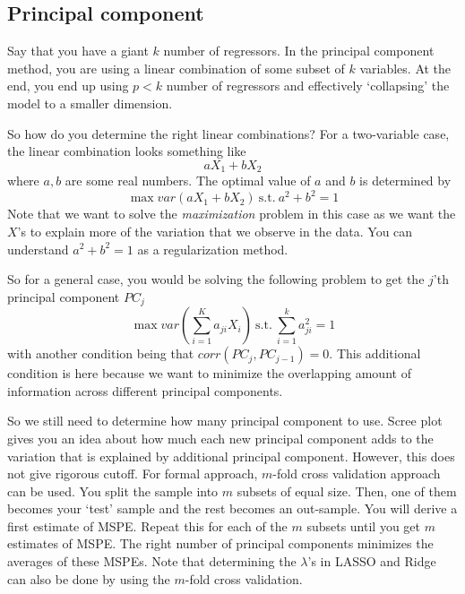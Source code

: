 \documentclass[12pt]{article}
\theoremstyle{definition}
\theoremstyle{property}
\theoremstyle{assumption}
\theoremstyle{example}
\theoremstyle{comment}
\begin{document}
\subsection{Principal component}
Say that you have a giant $k$ number of regressors. In the principal component method, you are using a linear combination of some subset of $k$ variables. At the end, you end up using $p<k$ number of regressors and effectively `collapsing' the model to a smaller dimension. 
\par\medskip
So how do you determine the right linear combinations? For a two-variable case, the linear combination looks something like
\[
aX_1 + bX_2
\]
where $a,b$ are some real numbers. The optimal value of $a$ and $b$ is determined by
\[
\max var(aX_1+bX_2)\  \text{s.t.}\ a^2+b^2=1
\]
Note that we want to solve the \textit{maximization} problem in this case as we want the $X$'s to explain more of the variation that we observe in the data. You can understand $a^2+b^2=1$ as a regularization method. 
\par\medskip
So for a general case, you would be solving the following problem to get the $j$'th principal component $PC_j$
\[
\max var\left(\sum_{i=1}^Ka_{ji}X_i\right)\  \text{s.t.}\ \sum_{i=1}^ka_{ji}^2=1
\]
with another condition being that $corr(PC_j,PC_{j-1})=0$. This additional condition is here because we want to minimize the overlapping amount of information across different principal components.
\par\medskip
So we still need to determine how many principal component to use. Scree plot gives you an idea about how much each new principal component adds to the variation that is explained by additional principal component. However, this does not give rigorous cutoff. For formal approach, $m$-fold cross validation approach can be used. You split the sample into $m$ subsets of equal size. Then, one of them becomes your `test' sample and the rest becomes an out-sample. You will derive a first estimate of MSPE. Repeat this for each of the $m$ subsets until you get $m$ estimates of MSPE. The right number of  principal components minimizes the averages of these MSPEs. Note that determining the $\lambda$'s in LASSO and Ridge can also be done by using the $m$-fold cross validation. 
\end{document}

